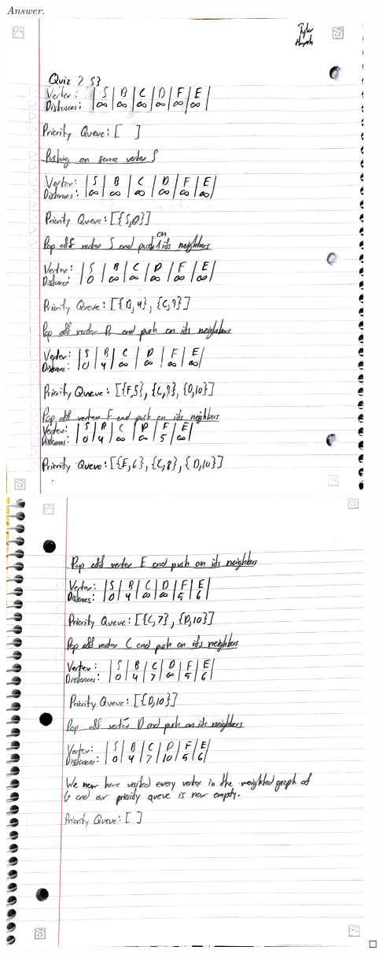 \documentclass[11pt]{article}
\theoremstyle{definition}
\theoremstyle{definition}
\theoremstyle{definition}
\begin{document}
\begin{proof}[Answer]
\includegraphics[width=0.9\textwidth]{Huynh_CSCI3104_Q2S3P1.pdf}\\
\includegraphics[width=0.9\textwidth]{Huynh_CSCI3104_Q2S3P2.pdf}

\end{proof}




\end{document}
